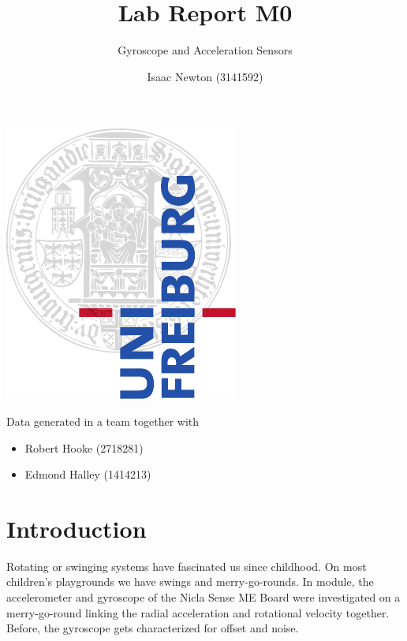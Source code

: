 \documentclass[DIV=14]{scrarticle}
\title{Lab Report M0}
\subtitle{Gyroscope and Acceleration Sensors}
\author{Isaac Newton (3141592)}
\begin{document}
\maketitle

\thispagestyle{empty}

\vfill
\begin{center}
    \includegraphics{ufcd-logo-e1-a4-color.pdf} \vspace{1cm} \\ 
\end{center}
\vfill

\begin{flushleft}
Data generated in a team together with
\begin{itemize}
    \item Robert Hooke (2718281)
    \item Edmond Halley (1414213)
\end{itemize}
\end{flushleft}



\clearpage

\section{Introduction}

Rotating or swinging systems have fascinated us since childhood. On most children’s playgrounds we have swings and merry-go-rounds. In module, the accelerometer and gyroscope of the Nicla Sense ME Board were investigated on a merry-go-round linking the radial acceleration and rotational velocity together. Before, the gyroscope gets characterized for offset and noise. \cite{labManual}
\end{document}
